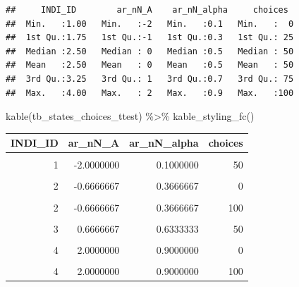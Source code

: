 \documentclass[
]{book}
\newenvironment{Shaded}{\begin{snugshade}}{\end{snugshade}}
\newcommand{\FunctionTok}[1]{\textcolor[rgb]{0.00,0.00,0.00}{#1}}
\newcommand{\NormalTok}[1]{#1}
\newcommand{\SpecialCharTok}[1]{\textcolor[rgb]{0.00,0.00,0.00}{#1}}
\begin{document}
\begin{verbatim}
##     INDI_ID        ar_nN_A    ar_nN_alpha     choices   
##  Min.   :1.00   Min.   :-2   Min.   :0.1   Min.   :  0  
##  1st Qu.:1.75   1st Qu.:-1   1st Qu.:0.3   1st Qu.: 25  
##  Median :2.50   Median : 0   Median :0.5   Median : 50  
##  Mean   :2.50   Mean   : 0   Mean   :0.5   Mean   : 50  
##  3rd Qu.:3.25   3rd Qu.: 1   3rd Qu.:0.7   3rd Qu.: 75  
##  Max.   :4.00   Max.   : 2   Max.   :0.9   Max.   :100
\end{verbatim}

\begin{Shaded}
\begin{Highlighting}[]
\FunctionTok{kable}\NormalTok{(tb\_states\_choices\_ttest) }\SpecialCharTok{\%\textgreater{}\%}
  \FunctionTok{kable\_styling\_fc}\NormalTok{()}
\end{Highlighting}
\end{Shaded}

\begin{table}[!h]
\centering
\begin{tabular}{r|r|r|r}
\hline
INDI\_ID & ar\_nN\_A & ar\_nN\_alpha & choices\\
\hline
\cellcolor{gray!6}{1} & \cellcolor{gray!6}{-2.0000000} & \cellcolor{gray!6}{0.1000000} & \cellcolor{gray!6}{0}\\
\hline
1 & -2.0000000 & 0.1000000 & 50\\
\hline
\cellcolor{gray!6}{1} & \cellcolor{gray!6}{-2.0000000} & \cellcolor{gray!6}{0.1000000} & \cellcolor{gray!6}{100}\\
\hline
2 & -0.6666667 & 0.3666667 & 0\\
\hline
\cellcolor{gray!6}{2} & \cellcolor{gray!6}{-0.6666667} & \cellcolor{gray!6}{0.3666667} & \cellcolor{gray!6}{50}\\
\hline
2 & -0.6666667 & 0.3666667 & 100\\
\hline
\cellcolor{gray!6}{3} & \cellcolor{gray!6}{0.6666667} & \cellcolor{gray!6}{0.6333333} & \cellcolor{gray!6}{0}\\
\hline
3 & 0.6666667 & 0.6333333 & 50\\
\hline
\cellcolor{gray!6}{3} & \cellcolor{gray!6}{0.6666667} & \cellcolor{gray!6}{0.6333333} & \cellcolor{gray!6}{100}\\
\hline
4 & 2.0000000 & 0.9000000 & 0\\
\hline
\cellcolor{gray!6}{4} & \cellcolor{gray!6}{2.0000000} & \cellcolor{gray!6}{0.9000000} & \cellcolor{gray!6}{50}\\
\hline
4 & 2.0000000 & 0.9000000 & 100\\
\hline
\end{tabular}
\end{table}
\end{document}

